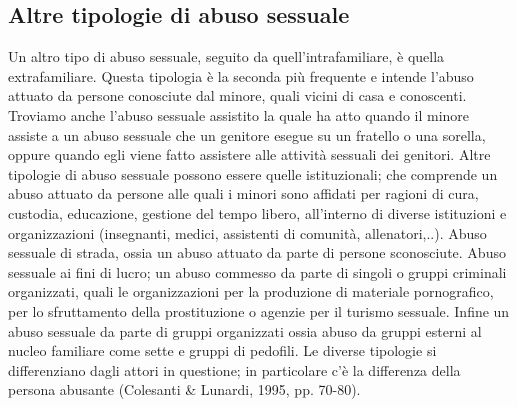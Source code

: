 \subsection{Altre tipologie di abuso sessuale}
Un altro tipo di abuso sessuale, seguito da quell’intrafamiliare, è quella extrafamiliare. Questa tipologia è la seconda più frequente e intende l’abuso attuato da persone conosciute dal minore, quali vicini di casa e conoscenti. Troviamo anche l’abuso sessuale assistito la quale ha atto quando il minore assiste a un abuso sessuale che un genitore esegue su un fratello o una sorella, oppure quando egli viene fatto assistere alle attività sessuali dei genitori. Altre tipologie di abuso sessuale possono essere quelle istituzionali; che comprende un abuso attuato da persone alle quali i minori sono affidati per ragioni di cura, custodia, educazione, gestione del tempo libero, all’interno di diverse istituzioni e organizzazioni (insegnanti, medici, assistenti di comunità, allenatori,..). Abuso sessuale di strada, ossia un abuso attuato da parte di persone sconosciute. Abuso sessuale ai fini di lucro; un abuso commesso da parte di singoli o gruppi criminali organizzati, quali le organizzazioni per la produzione di materiale pornografico, per lo sfruttamento della prostituzione o agenzie per il turismo sessuale. Infine un abuso sessuale da parte di gruppi organizzati ossia abuso da gruppi esterni al nucleo familiare come sette e gruppi di pedofili.
Le diverse tipologie si differenziano dagli attori in questione; in particolare c’è la differenza della persona abusante (Colesanti & Lunardi, 1995, pp. 70-80).
